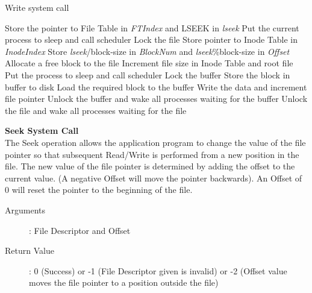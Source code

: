 \documentclass[10pt]{article}
\begin{document}
\begin{algorithm}
\caption{Write system call}
\begin{algorithmic}
\ENDIF
{}
\ELSE 
    \STATE Store the pointer to File Table in \textit{FTIndex} and LSEEK in \textit{lseek}
\ENDIF
{}
            \STATE Put the current process to sleep and call scheduler
        \ENDWHILE
    \ENDIF
\ENDIF
\STATE Lock the file
\STATE Store pointer to Inode Table in \textit{InodeIndex}
\STATE Store \textit{lseek}/block-size in \textit{BlockNum} and \textit{lseek}\%block-size in \textit{Offset}
    \ELSE
        \STATE Allocate a free block to the file
        \STATE Increment file size in Inode Table and root file
    \ENDIF
\ENDIF
{}
            \STATE Put the process to sleep and call scheduler
        \ENDWHILE
    \ENDIF
\ENDIF
\STATE Lock the buffer
        \STATE Store the block in buffer to disk
    \ENDIF
    \STATE Load the required block to the buffer
\ENDIF
\STATE Write the data and increment file pointer
\STATE Unlock the buffer and wake all processes waiting for the buffer
\STATE Unlock the file and wake all processes waiting for the file
\end{algorithmic}
\end{algorithm}
\vspace{3mm}
\textbf{Seek System Call}
\vspace{3mm}\\
The Seek operation allows the application program to change the value of the file pointer so that subsequent Read/Write is performed from a new position in the file. The new value of the file pointer is determined by adding the offset to the current value. (A negative Offset will move the pointer backwards). An Offset of 0 will reset the pointer to the beginning of the file. 
\begin{description}
	\item[Arguments]: File Descriptor and Offset
	\item[Return Value]: 0 (Success) or -1 (File Descriptor given is invalid) or -2 (Offset value moves the file pointer to a position outside the file)
\end{description} 
\end{document}
